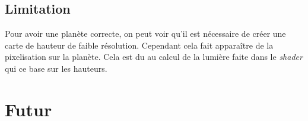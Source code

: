 \subsection{Limitation}

Pour avoir une planète correcte, on peut voir qu'il est nécessaire de créer une carte de hauteur de faible résolution. Cependant cela fait apparaître de la pixelisation sur la planète. Cela est du au calcul de la lumière faite dans le \textit{shader} qui ce base sur les hauteurs.

\section{Futur}


